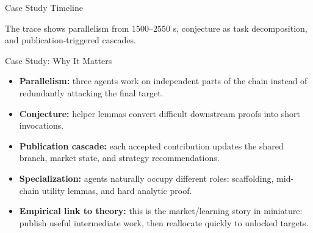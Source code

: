 \documentclass[10pt,aspectratio=169]{beamer}
\begin{document}
\begin{frame}{Case Study Timeline}
\scriptsize
\centering
{}

\vspace{0.8em}
\small
The trace shows parallelism from $1500$--$2550$ s, conjecture as task decomposition, and publication-triggered cascades.
\end{frame}

\begin{frame}{Case Study: Why It Matters}
\small
\begin{itemize}
  \item \textbf{Parallelism:} three agents work on independent parts of the chain instead of redundantly attacking the final target.
  \item \textbf{Conjecture:} helper lemmas convert difficult downstream proofs into short invocations.
  \item \textbf{Publication cascade:} each accepted contribution updates the shared branch, market state, and strategy recommendations.
  \item \textbf{Specialization:} agents naturally occupy different roles: scaffolding, mid-chain utility lemmas, and hard analytic proof.
  \item \textbf{Empirical link to theory:} this is the market/learning story in miniature: publish useful intermediate work, then reallocate quickly to unlocked targets.
\end{itemize}
\end{frame}
\end{document}
